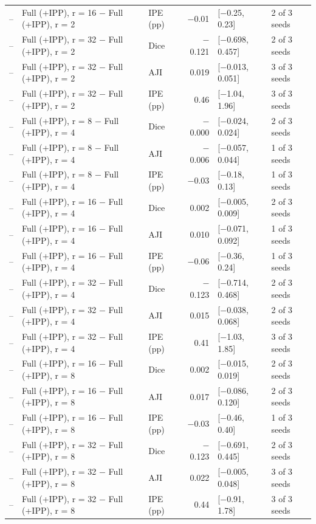 \documentclass[10pt]{article}
\begin{document}
\begin{landscape}
{\begin{longtable}{r l l r l l}
-- & Full (+IPP), r = 16 $-$ Full (+IPP), r = 2 & IPE (pp) & $-$0.01 & [$-$0.25, 0.23] & 2 of 3 seeds \\
-- & Full (+IPP), r = 32 $-$ Full (+IPP), r = 2 & Dice & $-$0.121 & [$-$0.698, 0.457] & 2 of 3 seeds \\
-- & Full (+IPP), r = 32 $-$ Full (+IPP), r = 2 & AJI & 0.019 & [$-$0.013, 0.051] & 3 of 3 seeds \\
-- & Full (+IPP), r = 32 $-$ Full (+IPP), r = 2 & IPE (pp) & 0.46 & [$-$1.04, 1.96] & 3 of 3 seeds \\
-- & Full (+IPP), r = 8 $-$ Full (+IPP), r = 4 & Dice & $-$0.000 & [$-$0.024, 0.024] & 2 of 3 seeds \\
-- & Full (+IPP), r = 8 $-$ Full (+IPP), r = 4 & AJI & $-$0.006 & [$-$0.057, 0.044] & 1 of 3 seeds \\
-- & Full (+IPP), r = 8 $-$ Full (+IPP), r = 4 & IPE (pp) & $-$0.03 & [$-$0.18, 0.13] & 1 of 3 seeds \\
-- & Full (+IPP), r = 16 $-$ Full (+IPP), r = 4 & Dice & 0.002 & [$-$0.005, 0.009] & 2 of 3 seeds \\
-- & Full (+IPP), r = 16 $-$ Full (+IPP), r = 4 & AJI & 0.010 & [$-$0.071, 0.092] & 1 of 3 seeds \\
-- & Full (+IPP), r = 16 $-$ Full (+IPP), r = 4 & IPE (pp) & $-$0.06 & [$-$0.36, 0.24] & 1 of 3 seeds \\
-- & Full (+IPP), r = 32 $-$ Full (+IPP), r = 4 & Dice & $-$0.123 & [$-$0.714, 0.468] & 2 of 3 seeds \\
-- & Full (+IPP), r = 32 $-$ Full (+IPP), r = 4 & AJI & 0.015 & [$-$0.038, 0.068] & 2 of 3 seeds \\
-- & Full (+IPP), r = 32 $-$ Full (+IPP), r = 4 & IPE (pp) & 0.41 & [$-$1.03, 1.85] & 3 of 3 seeds \\
-- & Full (+IPP), r = 16 $-$ Full (+IPP), r = 8 & Dice & 0.002 & [$-$0.015, 0.019] & 2 of 3 seeds \\
-- & Full (+IPP), r = 16 $-$ Full (+IPP), r = 8 & AJI & 0.017 & [$-$0.086, 0.120] & 2 of 3 seeds \\
-- & Full (+IPP), r = 16 $-$ Full (+IPP), r = 8 & IPE (pp) & $-$0.03 & [$-$0.46, 0.40] & 1 of 3 seeds \\
-- & Full (+IPP), r = 32 $-$ Full (+IPP), r = 8 & Dice & $-$0.123 & [$-$0.691, 0.445] & 2 of 3 seeds \\
-- & Full (+IPP), r = 32 $-$ Full (+IPP), r = 8 & AJI & 0.022 & [$-$0.005, 0.048] & 3 of 3 seeds \\
-- & Full (+IPP), r = 32 $-$ Full (+IPP), r = 8 & IPE (pp) & 0.44 & [$-$0.91, 1.78] & 3 of 3 seeds \\

\end{longtable}}
\end{landscape}
\end{document}
